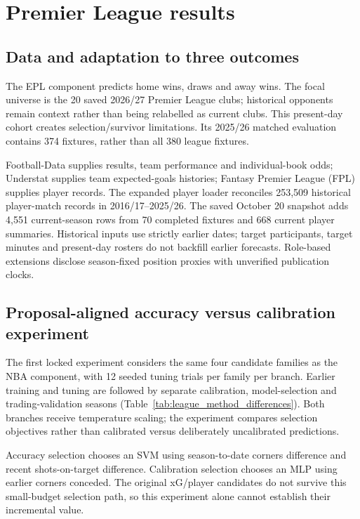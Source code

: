\documentclass[11pt,letterpaper]{article}
\begin{document}
\clearpage
\section{Premier League results}
\label{sec:epl}
\subsection{Data and adaptation to three outcomes}
The EPL component predicts home wins, draws and away wins. The focal universe
is the 20 saved 2026/27 Premier League clubs; historical opponents remain
context rather than being relabelled as current clubs. This present-day
cohort creates selection/survivor limitations. Its 2025/26 matched evaluation
contains 374 fixtures, rather than all 380 league fixtures.

Football-Data supplies results, team performance and individual-book odds;
Understat supplies team expected-goals histories; Fantasy Premier League
(FPL) supplies player records. The expanded player loader reconciles 253,509
historical player-match records in 2016/17--2025/26. The saved October 20
snapshot adds 4,551 current-season rows from 70 completed fixtures and 668
current player summaries. Historical inputs use strictly earlier dates;
target participants, target minutes and present-day rosters do not backfill
earlier forecasts. Role-based extensions disclose season-fixed position
proxies with unverified publication clocks.

\subsection{Proposal-aligned accuracy versus calibration experiment}
The first locked experiment considers the same four candidate families as the
NBA component, with 12 seeded tuning trials per family per branch. Earlier
training and tuning are followed by separate calibration, model-selection
and trading-validation seasons (Table~\ref{tab:league_method_differences}).
Both branches receive temperature scaling; the experiment compares selection
objectives rather than calibrated versus deliberately uncalibrated predictions.

Accuracy selection chooses an SVM using season-to-date corners difference
and recent shots-on-target difference. Calibration selection chooses an MLP
using earlier corners conceded. The original xG/player candidates do not
survive this small-budget selection path, so this experiment alone cannot
establish their incremental value.
\end{document}
